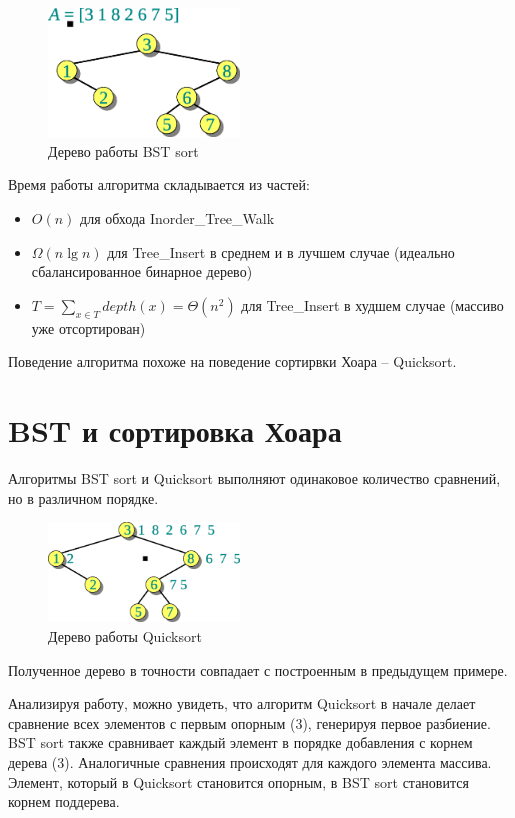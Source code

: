 \documentclass[11pt]{article}
\begin{document}
\begin{figure}[ht]
  \centering
  \includegraphics[width=2in]{lecture9/bs_tree.eps}
  \caption{Дерево работы BST sort}
  \label{fig:bs_tree}
\end{figure}

Время работы алгоритма складывается из частей:
\begin{itemize}
\item $O(n)$ для обхода Inorder\_Tree\_Walk
\item $\Omega(n \lg n)$ для Tree\_Insert в среднем и в лучшем случае (идеально сбалансированное бинарное дерево)
\item $T = \sum_{x \in T} depth(x) = \Theta(n^2)$ для Tree\_Insert в худшем случае (массиво уже отсортирован)
\end{itemize}

Поведение алгоритма похоже на поведение сортирвки Хоара -- Quicksort.

\section{BST и сортировка Хоара}
Алгоритмы BST sort и Quicksort выполняют одинаковое количество сравнений, но в различном порядке.
\begin{figure}[ht]
  \centering
  \includegraphics[width=2in]{lecture9/qs_tree.eps}
  \caption{Дерево работы Quicksort}
  \label{fig:qs_tree}
\end{figure}

Полученное дерево в точности совпадает с построенным в предыдущем примере.

Анализируя работу, можно увидеть, что алгоритм Quicksort в начале делает сравнение всех элементов с первым опорным (3), генерируя первое разбиение. BST sort также сравнивает каждый элемент в порядке добавления с корнем дерева (3). Аналогичные сравнения происходят для каждого элемента массива. Элемент, который в Quicksort становится опорным, в BST sort становится корнем поддерева.
\end{document}
